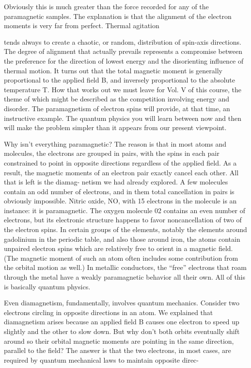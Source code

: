 {{Obviously this is much greater than the force recorded for any of
the paramagnetic samples. The explanation is that the alignment
of the electron moments is very far from perfect. Thermal agitation

tends always to create a chaotic, or random, distribution of spin-axis
directions. The degree of alignment that actually prevails represents
a compromise between the preference for the direction of lowest
energy and the disorienting influence of thermal motion. It turns
out that the total magnetic moment is generally proportional to the
applied field B, and inversely proportional to the absolute temperature
T. How that works out we must leave for Vol. V of this course,
the theme of which might be described as the competition involving
energy and disorder. The paramagnetism of electron spins will
provide, at that time, an instructive example. The quantum physics
you will learn between now and then will make the problem simpler
than it appears from our present viewpoint.

Why isn't everything paramagnetic? The reason is that in most
atoms and molecules, the electrons are grouped in pairs, with the
spins in each pair constrained to point in opposite directions regardless
of the applied field. As a result, the magnetic moments of an
electron pair exactly cancel each other. All that is left is the diamag-
netism we had already explored. A few molecules contain an odd
number of electrons, and in them total cancellation in pairs is obviously
impossible. Nitric oxide, NO, with 15 electrons in the molecule
is an instance: it is paramagnetic. The oxygen molecule 02
contains an even number of electrons, but its electronic structure
happens to favor noncancellation of two of the electron spins. In
certain groups of the elements, notably the elements around gadolinium
in the periodic table, and also those around iron, the atoms
contain unpaired electron spins which are relatively free to orient
in a magnetic field. (The magnetic moment of such an atom often
includes some contribution from the orbital motion as well.) In
metallic conductors, the ``free'' electrons that roam through the metal
have a weakly paramagnetic behavior all their own. All of this is
basically quantum physics.

Even diamagnetism, fundamentally, involves quantum mechanics.
Consider two electrons circling in opposite directions in an atom.
We explained that diamagnetism arises because an applied field B
causes one electron to speed up slightly and the other to slow down.
But why don't both orbits eventually shift around so their orbital
magnetic moments are pointing in the same direction, parallel to
the field? The answer is that the two electrons, in most cases, are
required by quantum mechanical laws to maintain opposite direc-

}}
